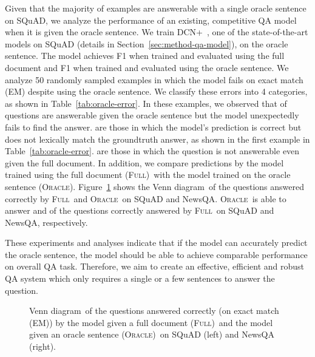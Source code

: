 \documentclass[11pt,a4paper]{article}
\newcommand{\full}{\textsc{Full}}
\newcommand{\oracle}{\textsc{Oracle}}
\newcommand{\fullshort}{(\textsc{Full})}
\newcommand{\oracleshort}{(\textsc{Oracle})}
\newcommand{\venndiagram}{Venn diagram}
\begin{document}
Given that the majority of examples are answerable with a single oracle sentence on SQuAD, we analyze the performance of an existing, competitive QA model when it is given the oracle sentence.
We train DCN+~\citep{dcn+}, one of the state-of-the-art models on SQuAD (details in Section~\ref{sec:method-qa-model}), on the oracle sentence.
The model achieves  F1 when trained and evaluated using the full document and  F1 when trained and evaluated using the oracle sentence.
We analyze 50 randomly sampled examples in which the model fails on exact match (EM) despite using the oracle sentence.
We classify these errors into 4 categories, as shown in Table~\ref{tab:oracle-error}.
In these examples, we observed that  of questions are answerable given the oracle sentence but the model unexpectedly fails to find the answer.
 are those in which the model's prediction is correct but does not lexically match the groundtruth answer, as shown in the first example in Table~\ref{tab:oracle-error}.
 are those in which the question is not answerable even given the full document.
In addition, we compare predictions by the model trained using the full document \fullshort~with the model trained on the oracle sentence \oracleshort.
Figure~\ref{fig:full-and-oracle} shows the \venndiagram~of the questions answered correctly by \full~and \oracle~on SQuAD and NewsQA. \oracle~is able to answer  and  of the questions correctly answered by \full~on SQuAD and NewsQA, respectively.

These experiments and analyses indicate that if the model can accurately predict the oracle sentence, the model should be able to achieve comparable performance on overall QA task. 
Therefore, we aim to create an effective, efficient and robust QA system which only requires a single or a few sentences to answer the question.



\begin{figure}[!tb]
\centering
{}
\caption{
\venndiagram~of the questions answered correctly (on exact match (EM)) by the model given a full document \fullshort~and the model given an oracle sentence \oracleshort~on SQuAD (left) and NewsQA (right).
}
\label{fig:full-and-oracle}
\end{figure}
\end{document}
